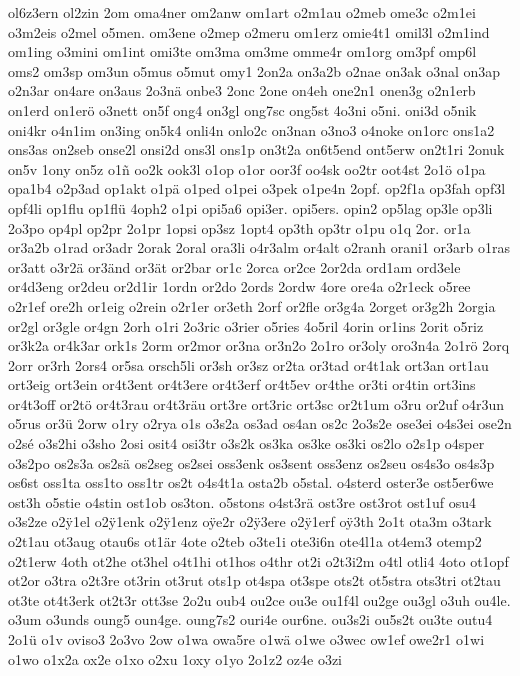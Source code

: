 {ol6z3ern
ol2zin
2om
oma4ner
om2anw
om1art
o2m1au
o2meb
ome3c
o2m1ei
o3m2eis
o2mel
o5men.
om3ene
o2mep
o2meru
om1erz
omie4t1
omil3l
o2m1ind
om1ing
o3mini
om1int
omi3te
om3ma
om3me
omme4r
om1org
om3pf
omp6l
oms2
om3sp
om3un
o5mus
o5mut
omy1
2on2a
on3a2b
o2nae
on3ak
o3nal
on3ap
o2n3ar
on4are
on3aus
2o3nä
onbe3
2onc
2one
on4eh
one2n1
onen3g
o2n1erb
on1erd
on1erö
o3nett
on5f
ong4
on3gl
ong7sc
ong5st
4o3ni
o5ni.
oni3d
o5nik
oni4kr
o4n1im
on3ing
on5k4
onli4n
onlo2c
on3nan
o3no3
o4noke
on1orc
ons1a2
ons3as
on2seb
onse2l
onsi2d
ons3l
ons1p
on3t2a
on6t5end
ont5erw
on2t1ri
2onuk
on5v
1ony
on5z
o1ñ
oo2k
ook3l
o1op
o1or
oor3f
oo4sk
oo2tr
oot4st
2o1ö
o1pa
opa1b4
o2p3ad
op1akt
o1pä
o1ped
o1pei
o3pek
o1pe4n
2opf.
op2f1a
op3fah
opf3l
opf4li
op1flu
op1flü
4oph2
o1pi
opi5a6
opi3er.
opi5ers.
opin2
op5lag
op3le
op3li
2o3po
op4pl
op2pr
2o1pr
1opsi
op3sz
1opt4
op3th
op3tr
o1pu
o1q
2or.
or1a
or3a2b
o1rad
or3adr
2orak
2oral
ora3li
o4r3alm
or4alt
o2ranh
orani1
or3arb
o1ras
or3att
o3r2ä
or3änd
or3ät
or2bar
or1c
2orca
or2ce
2or2da
ord1am
ord3ele
or4d3eng
or2deu
or2d1ir
1ordn
or2do
2ords
2ordw
4ore
ore4a
o2r1eck
o5ree
o2r1ef
ore2h
or1eig
o2rein
o2r1er
or3eth
2orf
or2fle
or3g4a
2orget
or3g2h
2orgia
or2gl
or3gle
or4gn
2orh
o1ri
2o3ric
o3rier
o5ries
4o5ril
4orin
or1ins
2orit
o5riz
or3k2a
or4k3ar
ork1s
2orm
or2mor
or3na
or3n2o
2o1ro
or3oly
oro3n4a
2o1rö
2orq
2orr
or3rh
2ors4
or5sa
orsch5li
or3sh
or3sz
or2ta
or3tad
or4t1ak
ort3an
ort1au
ort3eig
ort3ein
or4t3ent
or4t3ere
or4t3erf
or4t5ev
or4the
or3ti
or4tin
ort3ins
or4t3off
or2tö
or4t3rau
or4t3räu
ort3re
ort3ric
ort3sc
or2t1um
o3ru
or2uf
o4r3un
o5rus
or3ü
2orw
o1ry
o2rya
o1s
o3s2a
os3ad
os4an
os2c
2o3s2e
ose3ei
o4s3ei
ose2n
o2sé
o3s2hi
o3sho
2osi
osit4
osi3tr
o3s2k
os3ka
os3ke
os3ki
os2lo
o2s1p
o4sper
o3s2po
os2s3a
os2sä
os2seg
os2sei
oss3enk
os3sent
oss3enz
os2seu
os4s3o
os4s3p
os6st
oss1ta
oss1to
oss1tr
os2t
o4s4t1a
osta2b
o5stal.
o4sterd
oster3e
ost5er6we
ost3h
o5stie
o4stin
ost1ob
os3ton.
o5stons
o4st3rä
ost3re
ost3rot
ost1uf
osu4
o3s2ze
o2^^ff1el
o2^^ff1enk
o2^^ff1enz
o^^ffe2r
o2^^ff3ere
o2^^ff1erf
o^^ff3th
2o1t
ota3m
o3tark
o2t1au
ot3aug
otau6s
ot1är
4ote
o2teb
o3te1i
ote3i6n
ote4l1a
ot4em3
otemp2
o2t1erw
4oth
ot2he
ot3hel
o4t1hi
ot1hos
o4thr
ot2i
o2t3i2m
o4tl
otli4
4oto
ot1opf
ot2or
o3tra
o2t3re
ot3rin
ot3rut
ots1p
ot4spa
ot3spe
ots2t
ot5stra
ots3tri
ot2tau
ot3te
ot4t3erk
ot2t3r
ott3se
2o2u
oub4
ou2ce
ou3e
ou1f4l
ou2ge
ou3gl
o3uh
ou4le.
o3um
o3unds
oung5
oun4ge.
oung7s2
ouri4e
our6ne.
ou3s2i
ou5s2t
ou3te
outu4
2o1ü
o1v
oviso3
2o3vo
2ow
o1wa
owa5re
o1wä
o1we
o3wec
ow1ef
owe2r1
o1wi
o1wo
o1x2a
ox2e
o1xo
o2xu
1oxy
o1yo
2o1z2
oz4e
o3zi
}
